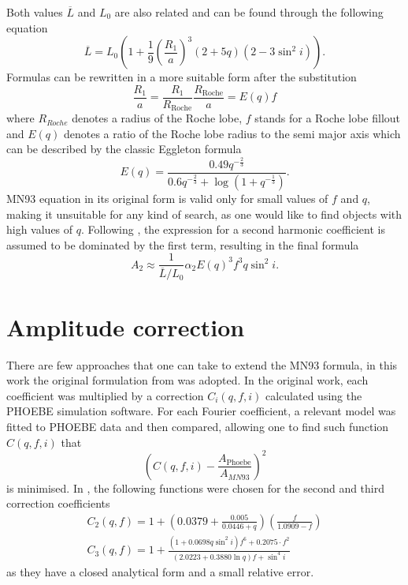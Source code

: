 \documentclass{pracalicmgr}
\begin{document}
Both values $\overline{L}$ and $L_0$ are also related and can be found through the following equation
\begin{equation}
    \overline{L}=L_0\left(1+\frac{1}{9}\left(\frac{R_1}{a}\right)^3(2+5q)(2-3\sin^2{i})\right).
\end{equation}
Formulas can be rewritten in a more suitable form after the substitution
\begin{equation}
    \frac{R_1}{a}=\frac{R_1}{R_{\textrm{Roche}}}\frac{R_{\textrm{Roche}}}{a}=E(q)f
\end{equation}
where $R_{Roche}$ 
denotes a radius of the Roche lobe, $f$ stands for a Roche lobe fillout and $E(q)$ denotes a ratio of the Roche lobe radius to the semi major axis which can be described by the classic Eggleton formula 
\citep{eggleton_approximations_1983}
\begin{equation}
    E(q)=\frac{0.49q^{-\frac{2}{3}}}{0.6q^{-\frac{2}{3}}+\log{(1+q^{-\frac{1}{3}})}}.
\end{equation}
MN93 equation in its original form is valid only for small values of $f$ and $q$, making it unsuitable for any kind of search, as one would like to find objects with high values of $q$.
Following \citet{gomel_search_2021-1}, the expression for a second harmonic coefficient is assumed to be dominated by the first term, resulting in the final formula 
\begin{equation}
    A_2\approx \frac{1}{\overline{L}/L_0} \alpha_2 E(q)^3 f^3 q \sin^2{i}.
\end{equation}
\section{Amplitude correction}
There are few approaches that one can take to extend the MN93 formula, in this work the original formulation from \citet{gomel_search_2021-1} was adopted.
In the original work, each coefficient was multiplied by a correction $C_i(q,f,i)$ calculated using the PHOEBE simulation software. For each
Fourier coefficient, a relevant model was fitted to PHOEBE data and then compared, allowing one to find such function $C(q,f,i)$ that 
\begin{equation}
    \left(C(q,f,i)-\frac{A_{\textrm{Phoebe}}}{A_{MN93}}\right)^2
\end{equation}
is minimised. In \citet{gomel_search_2021-1}, the following functions were chosen for the second and third correction coefficients
\begin{align}
    C_2(q,f)=1+\left(0.0379+\frac{0.005}{0.0446+q}\right)\left(\frac{f}{1.0909-f}\right)\\
    C_3(q,f)=1+\frac{(1+0.0698q\sin^2{i})f^6+0.2075\cdot f^2}{(2.0223+0.3880\ln{q})f+\sin^4{i}}
\end{align}
as they have a closed analytical form and a small relative error. 
\end{document}
